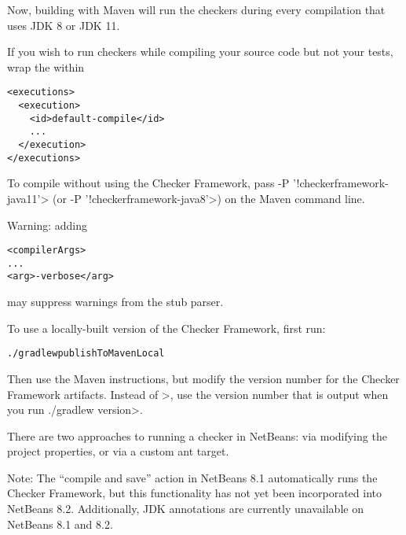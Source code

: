 \begin{enumerate}
Now, building with Maven will run the checkers during every compilation
that uses JDK 8 or JDK 11.

If you wish to run checkers while compiling your source code but not your
tests, wrap the  within

\begin{Verbatim}
<executions>
  <execution>
    <id>default-compile</id>
    ...
  </execution>
</executions>
\end{Verbatim}

To compile without using the Checker Framework, pass
\<-P '!checkerframework-java11'> (or \<-P '!checkerframework-java8'>)
on the Maven command line.

Warning:  adding

\begin{mysmall}
\begin{alltt}
<compilerArgs>
  ...
  <arg>-verbose</arg>
\end{alltt}
\end{mysmall}

\noindent
may suppress warnings from the stub parser.

\end{enumerate}



To use a locally-built version of the Checker Framework, first run:

\begin{alltt}
./gradlew publishToMavenLocal
\end{alltt}

\noindent
Then use the Maven instructions, but modify the version number for the
Checker Framework artifacts.  Instead of \<\ReleaseVersion{}>, use the
version number that is output when you run \<./gradlew version>.



There are two approaches to running a checker in NetBeans:  via modifying the
project properties, or via a custom ant target.

Note: The ``compile and save'' action in NetBeans 8.1 automatically
runs the Checker Framework, but this functionality has not yet
been incorporated into NetBeans 8.2. Additionally, JDK annotations
are currently unavailable on NetBeans 8.1 and 8.2.



